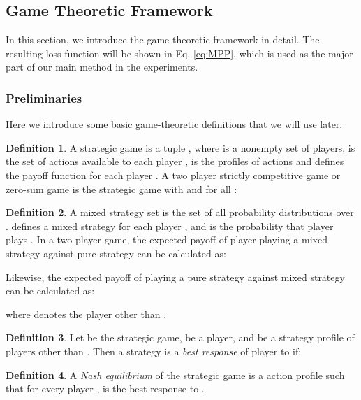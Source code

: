 \documentclass{article}
\theoremstyle{definition}
\newtheorem{definition}{Definition}
\begin{document}
\subsection{Game Theoretic Framework}
In this section, we introduce the game theoretic framework in detail. The resulting loss function will be shown in Eq. \ref{eq:MPP}, which is used as the major part of our main method in the experiments.
\subsubsection{Preliminaries}
Here we introduce some basic game-theoretic definitions \cite{myerson1991game} that we will use later.

\begin{definition} \label{game}
A strategic game is a tuple , where  is a nonempty set of players,  is the set of actions available to each player ,  is the profiles of actions and  defines the payoff function for each player .  
 A two player strictly competitive game or zero-sum game is the strategic game  with  and for all :

\end{definition} 

\begin{definition}
   A mixed strategy set  is the set of all probability distributions over .  defines a mixed strategy for each player , and  is the probability that player  plays . In a two player game, the expected payoff of player  playing a mixed strategy against pure strategy  can be calculated as:
   
   Likewise, the expected payoff of playing a pure strategy  against mixed strategy can be calculated as:
   
   where  denotes the player other than .
\end{definition}

\begin{definition} \label{response}
Let  be the strategic game,  be a player, and  be a strategy profile of players other than . Then a strategy  is a \textit{best response} of player  to  if:

\end{definition}

\begin{definition} \label{nash}
A \textit{Nash equilibrium} of the strategic game  is a action profile  such that for every player ,  is the best response to .
\end{definition}
\end{document}
